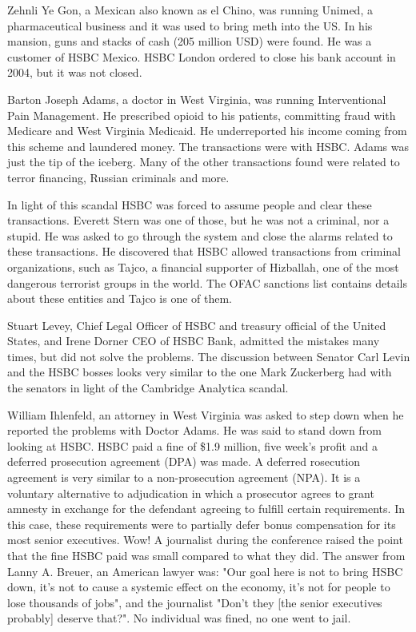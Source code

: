 Zehnli Ye Gon, a Mexican also known as el Chino, was running Unimed, a pharmaceutical business and it was used to bring meth into the US. In his mansion, guns and stacks of cash (205 million USD) were found. He was a customer of HSBC Mexico. HSBC London ordered to close his bank account in 2004, but it was not closed.

Barton Joseph Adams, a doctor in West Virginia, was running Interventional Pain Management. He prescribed opioid to his patients, committing fraud with Medicare and West Virginia Medicaid. He underreported his income coming from this scheme and laundered money. The transactions were with HSBC. Adams was just the tip of the iceberg. Many of the other transactions found were related to terror financing, Russian criminals and more.

In light of this scandal HSBC was forced to assume people and clear these transactions. Everett Stern was one of those, but he was not a criminal, nor a stupid. He was asked to go through the system and close the alarms related to these transactions. He discovered that HSBC allowed transactions from criminal organizations, such as Tajco, a financial supporter of Hizballah, one of the most dangerous terrorist groups in the world. The OFAC sanctions list contains details about these entities and Tajco is one of them. 

Stuart Levey, Chief Legal Officer of HSBC and treasury official of the United States, and Irene Dorner  CEO of HSBC Bank, admitted the mistakes many times, but did not solve the problems. The discussion between Senator Carl Levin and the HSBC bosses looks very similar to the one Mark Zuckerberg had with the senators in light of the Cambridge Analytica scandal.

William Ihlenfeld, an attorney in West Virginia was asked to step down when he reported the problems with Doctor Adams. He was said to stand down from looking at HSBC.
HSBC paid a fine of \$1.9 million, five week's profit and a deferred prosecution agreement (DPA) was made. A deferred rosecution agreement is very similar to a non-prosecution agreement (NPA). It is a voluntary alternative to adjudication in which a prosecutor agrees to grant amnesty in exchange for the defendant agreeing to fulfill certain requirements. In this case, these requirements were to partially defer bonus compensation for its most senior executives. Wow! A journalist during the conference raised the point that the fine HSBC paid was small compared to what they did. The answer from Lanny A. Breuer, an American lawyer was: "Our goal here is not to bring HSBC down, it's not to cause a systemic effect on the economy, it's not for people to lose thousands of jobs", and the journalist "Don't they [the senior executives probably] deserve that?". No individual was fined, no one went to jail.

